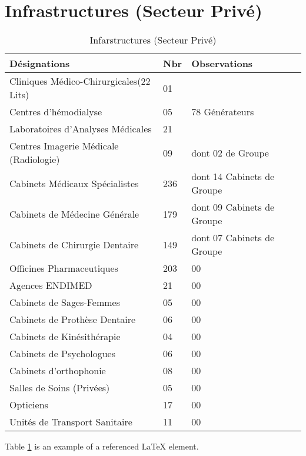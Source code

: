 \section{Infrastructures (Secteur Privé)}
\begin{table}[h!]
\begin{center}
\begin{tabular}{|p{7cm}|p{1cm}|p{5cm}|}
\hline
Désignations                           & Nbr	          &Observations \\
\hline
Cliniques Médico-Chirurgicales(22 Lits)&01              &\\
Centres d’hémodialyse 	               &05	            &78 Générateurs\\
Laboratoires d’Analyses Médicales 	   &21	            &\\
Centres Imagerie Médicale (Radiologie) &09	            &dont 02 de Groupe\\
Cabinets Médicaux Spécialistes	       &236	            &dont 14 Cabinets de Groupe\\
Cabinets de Médecine Générale	         &179 	          &dont 09 Cabinets de Groupe\\
Cabinets de Chirurgie Dentaire	       &149 	          &dont 07 Cabinets de Groupe\\
Officines Pharmaceutiques 	           &203             &00\\
Agences ENDIMED	                       &21              &00\\
Cabinets de Sages-Femmes	             &05	            &00\\
Cabinets de Prothèse Dentaire	         &06              &00\\
Cabinets de Kinésithérapie	           &04              &00\\
Cabinets de Psychologues 	             &06              &00\\
Cabinets d’orthophonie	               &08              &00\\
Salles de Soins (Privées)	             &05              &00\\
Opticiens 	                           &17              &00\\
Unités de Transport Sanitaire	         &11	            &00\\
\hline
\end{tabular}
\end{center}
\caption{Infarstructures (Secteur Privé)}
\label{table:4}
\end{table}
Table \ref{table:4} is an example of a referenced \LaTeX{} element.



